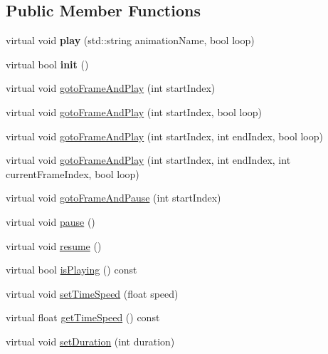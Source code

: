 \subsection*{Public Member Functions}
\begin{DoxyCompactItemize}
\item 
\mbox{\label{classActionTimeline_a99208d6888d1613b10688cd0d67a96b9}} 
virtual void {\bfseries play} (std\+::string animation\+Name, bool loop)
\item 
\mbox{\label{classActionTimeline_a97d5005d7265287953c84750f1bb8047}} 
virtual bool {\bfseries init} ()
\item 
virtual void \hyperlink{classActionTimeline_a4238a481e46b75754dd011dfd89844fd}{goto\+Frame\+And\+Play} (int start\+Index)
\item 
virtual void \hyperlink{classActionTimeline_ac480c1d28f280c0d0cdc3f02fb49bd24}{goto\+Frame\+And\+Play} (int start\+Index, bool loop)
\item 
virtual void \hyperlink{classActionTimeline_a58d78a5ff4ec42ffa5479d6e78b022f4}{goto\+Frame\+And\+Play} (int start\+Index, int end\+Index, bool loop)
\item 
virtual void \hyperlink{classActionTimeline_aa29be693e814edb656d27fd7942f24da}{goto\+Frame\+And\+Play} (int start\+Index, int end\+Index, int current\+Frame\+Index, bool loop)
\item 
virtual void \hyperlink{classActionTimeline_a6b6b51dd09ee1d2e48fd5e5aadb3b44d}{goto\+Frame\+And\+Pause} (int start\+Index)
\item 
virtual void \hyperlink{classActionTimeline_a661e21d092b57a08a07afbb94a7ebcf0}{pause} ()
\item 
virtual void \hyperlink{classActionTimeline_aa18d7c57e37b11e378c0718ea78e3f55}{resume} ()
\item 
virtual bool \hyperlink{classActionTimeline_a8fd08f788d11f91803dd82808d153f28}{is\+Playing} () const
\item 
virtual void \hyperlink{classActionTimeline_a24ba56fd33efc2bc0d0a4fc31e4043d6}{set\+Time\+Speed} (float speed)
\item 
virtual float \hyperlink{classActionTimeline_a290ee51f489337c15119fdef29005cf9}{get\+Time\+Speed} () const
\item 
virtual void \hyperlink{classActionTimeline_ab1e49839f767641b62e2a450269fb5b8}{set\+Duration} (int duration)
\item 

\end{DoxyCompactItemize}
